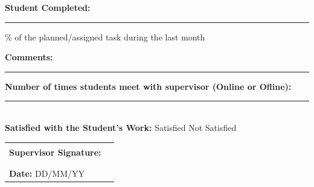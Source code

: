 \documentclass[12pt,a4paper]{article}
\begin{document}
\noindent\textbf{Student Completed:} \rule{3cm}{0.4pt}\% 
of the planned/assigned task during the last month

\vspace{0.5cm}

\noindent\textbf{Comments:}

\vspace{2cm}
\noindent\rule{\textwidth}{0.4pt}

\vspace{0.5cm}

\noindent\textbf{Number of times students meet with supervisor (Online or Ofline):} \rule{1cm}{0.4pt} \\

\noindent\textbf{Satisfied with the Student's Work:} 
\hspace{0.5cm}  Satisfied 
\hspace{1cm}  Not Satisfied

\vspace{0.5cm}



\vspace{1.5cm}

\noindent\begin{tabular}{p{7cm} p{6cm}}
\textbf{Supervisor Signature:} & \rule{5cm}{0.4pt} \\
\\

\textbf{Date:} DD/MM/YY
\end{tabular}

\vspace{0.8cm}
\end{document}

